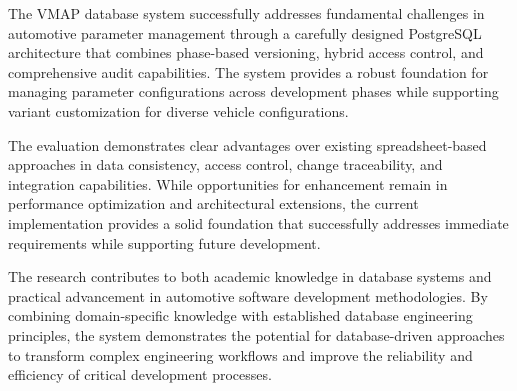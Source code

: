 The \ac{VMAP} database system successfully addresses fundamental challenges in automotive parameter management through a carefully designed PostgreSQL architecture that combines phase-based versioning, hybrid access control, and comprehensive audit capabilities. The system provides a robust foundation for managing parameter configurations across development phases while supporting variant customization for diverse vehicle configurations.

The evaluation demonstrates clear advantages over existing spreadsheet-based approaches in data consistency, access control, change traceability, and integration capabilities. While opportunities for enhancement remain in performance optimization and architectural extensions, the current implementation provides a solid foundation that successfully addresses immediate requirements while supporting future development.

The research contributes to both academic knowledge in database systems and practical advancement in automotive software development methodologies. By combining domain-specific knowledge with established database engineering principles, the system demonstrates the potential for database-driven approaches to transform complex engineering workflows and improve the reliability and efficiency of critical development processes.